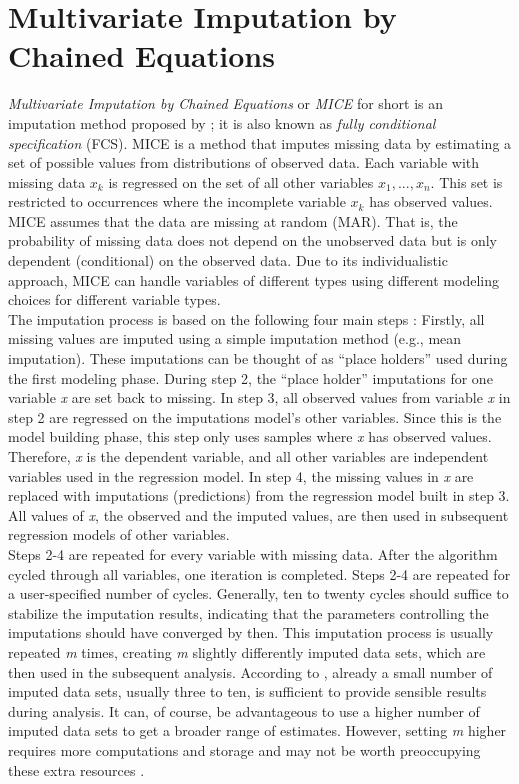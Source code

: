 \section{Multivariate Imputation by Chained Equations}
\textit{Multivariate Imputation by Chained Equations} or \textit{MICE} for 
short is an imputation method proposed by \citeauthor{RN135} \cite{RN135}; it 
is also known as \textit{fully conditional specification} (FCS).
MICE is a method that imputes missing data by estimating a set of possible 
values from distributions of observed data. Each variable with missing data 
$x_k$ is regressed on the set of all other variables $x_1,..., x_n$. This set 
is restricted to occurrences where the incomplete variable $x_k$ has 
observed values.
MICE assumes that the data are missing at random (MAR). That is, the 
probability 
of missing data does not depend on the unobserved data but is only 
dependent (conditional) on the observed data. Due to its individualistic 
approach, MICE can handle variables of different types using different 
modeling choices for different variable types.
\\
The imputation process is based on the following four main steps \cite{RN142, 
RN141}: Firstly, all missing values are imputed using a simple imputation 
method (e.g., mean imputation). These imputations can be thought of as ``place 
holders'' used during the first modeling phase. During step 2, the ``place 
holder'' imputations for one variable \textit{x} are set back to missing. In 
step 3, all observed values from variable \textit{x} in step 2 are regressed on 
the imputations model's other variables. Since this is the model building 
phase, this step only uses samples where \textit{x} has observed values. 
Therefore, \textit{x} is the dependent variable, and all other variables are 
independent variables used in the regression model. In step 4, the missing 
values in \textit{x} are replaced with imputations (predictions) from the 
regression model built in step 3. All values of \textit{x}, the observed and the 
imputed values, are then used in subsequent regression models of other 
variables.
\\
Steps 2-4 are repeated for every variable with missing data. After the 
algorithm cycled through all variables, one iteration is 
completed. Steps 2-4 are repeated for a user-specified number of cycles. 
Generally, ten to twenty cycles should suffice to stabilize the imputation 
results, indicating that the parameters controlling the imputations should have 
converged by then. This imputation process is usually repeated \textit{m} 
times, creating \textit{m} slightly differently imputed data sets, which are 
then used in the subsequent analysis. According to \cite{RN144, RN141, RN142}, 
already a 
small number of imputed data sets, usually three to ten, is sufficient to 
provide sensible results during analysis. It can, of course, be advantageous 
to use a higher number of imputed data sets to get a broader range of 
estimates. However, setting \textit{m} higher requires more computations and 
storage 
and may not be worth preoccupying these extra resources \cite{RN144}.

